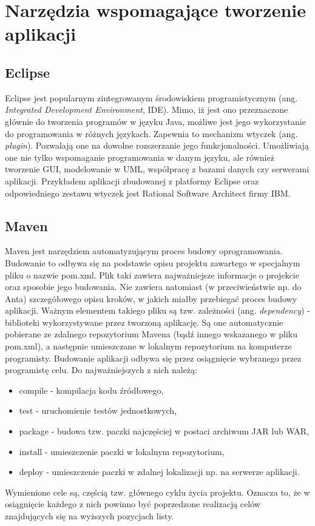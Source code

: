 \section[Narzędzia wspomagające tworzenie aplikacji][Narzędzia wspomagające tworzenie aplikacji]{Narzędzia wspomagające tworzenie aplikacji}

\subsection[Eclipse][Eclipse]{Eclipse}
Eclipse jest popularnym zintegrowanym środowiskiem programistycznym (ang. \textit{Integrated Development Environment}, IDE). Mimo, iż jest ono przeznaczone głównie do tworzenia programów w języku Java, możliwe jest jego wykorzystanie do programowania w różnych językach. Zapewnia to mechanizm wtyczek (ang. \textit{plugin}). Pozwalają one na dowolne rozszerzanie jego funkcjonalności. Umożliwiają one nie tylko wspomaganie programowania w danym języku, ale również tworzenie GUI, modelowanie w UML, współpracę z bazami danych czy serwerami aplikacji. Przykładem aplikacji zbudowanej z platformy Eclipse oraz odpowiedniego zestawu wtyczek jest Rational Software Architect firmy IBM.

\subsection[Maven][Maven]{Maven}
Maven jest narzędziem automatyzującym proces budowy oprogramowania. Budowanie to odbywa się na podstawie opisu projektu zawartego w specjalnym pliku o nazwie pom.xml. Plik taki zawiera najważniejsze informacje o projekcie oraz sposobie jego budowania. Nie zawiera natomiast (w przeciwieństwie np. do Anta) szczegółowego opisu kroków, w jakich miałby przebiegać proces budowy aplikacji. Ważnym elementem takiego pliku są tzw. zależności (ang. \textit{dependency}) - biblioteki wykorzystywane przez tworzoną aplikację. Są one automatycznie pobierane ze zdalnego repozytorium Mavena (bądź innego wskazanego w pliku pom.xml), a następnie umieszczane w lokalnym repozytorium na komputerze programisty. Budowanie aplikacji odbywa się przez osiągnięcie wybranego przez programistę celu. Do najważniejszych z nich należą:
\begin{itemize}
	\item compile - kompilacja kodu źródłowego,
	\item test - uruchomienie testów jednostkowych,
	\item package - budowa tzw. paczki najczęściej w postaci archiwum JAR lub WAR,
	\item install - umieszczenie paczki w lokalnym repozytorium,
	\item deploy - umieszczenie paczki w zdalnej lokalizacji np. na serwerze aplikacji.
\end{itemize}
Wymienione cele są, częścią tzw. głównego cyklu życia projektu. Oznacza to, że w osiągnięcie każdego z nich powinno być poprzedzone realizacją celów znajdujących się na wyższych pozycjach listy.

